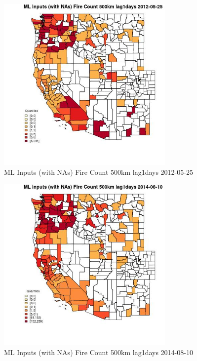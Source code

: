 \begin{figure} 
\centering  
\includegraphics[width=0.77\textwidth]{Code_Outputs/Report_ML_input_PM25_Step4_part_e_de_duplicated_aves_compiled_2019-05-18wNAs_CountyFire_Count_500km_lag1daysMean2012-05-25_2012-05-25.jpg} 
\caption{\label{fig:Report_ML_input_PM25_Step4_part_e_de_duplicated_aves_compiled_2019-05-18wNAsCountyFire_Count_500km_lag1daysMean2012-05-25_2012-05-25}ML Inputs (with NAs) Fire Count 500km lag1days 2012-05-25} 
\end{figure} 
 

\begin{figure} 
\centering  
\includegraphics[width=0.77\textwidth]{Code_Outputs/Report_ML_input_PM25_Step4_part_e_de_duplicated_aves_compiled_2019-05-18wNAs_CountyFire_Count_500km_lag1daysMean2014-08-10_2014-08-10.jpg} 
\caption{\label{fig:Report_ML_input_PM25_Step4_part_e_de_duplicated_aves_compiled_2019-05-18wNAsCountyFire_Count_500km_lag1daysMean2014-08-10_2014-08-10}ML Inputs (with NAs) Fire Count 500km lag1days 2014-08-10} 
\end{figure} 
 

